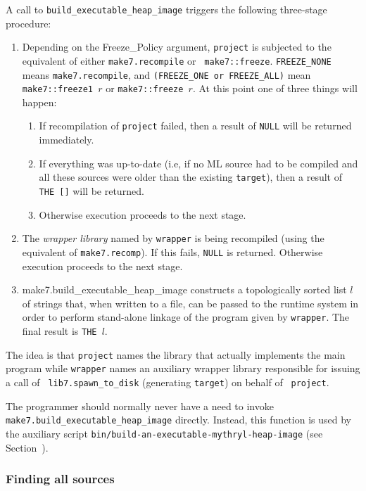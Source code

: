 A call to {\tt build_executable_heap_image} triggers the following three-stage
procedure:
\begin{enumerate}
\item Depending on the Freeze_Policy argument, {\tt project} is
subjected to the equivalent of either {\tt make7.recompile} or {\tt
make7::freeze}.  {\tt FREEZE_NONE} means {\tt make7.recompile}, and {\tt (FREEZE_ONE or FREEZE_ALL)}
mean {\tt make7::freeze1 $r$} or  {\tt make7::freeze $r$}.
At this point one of three things will happen:
\begin{enumerate}
\item If recompilation of {\tt project}
failed, then a result of {\tt NULL} will be returned immediately.
\item If everything was up-to-date (i.e, if no ML source had to be compiled
and all these sources were older than the existing {\tt target}), then
a result of {\tt THE []} will be returned.
\item Otherwise execution proceeds to the next stage.
\end{enumerate}
\item The {\em wrapper library} named by {\tt wrapper} is being
recompiled (using the equivalent of {\tt make7.recomp}).  If this
fails, {\tt NULL} is returned.  Otherwise execution proceeds to the
next stage.
\item {make7.build_executable_heap_image} constructs a topologically sorted list $l$
of strings that, when written to a file, can be passed to the runtime
system in order to perform stand-alone linkage of the program given by
{\tt wrapper}.  The final result is {\tt THE $l$}.
\end{enumerate}

The idea is that {\tt project} names the library that actually
implements the main program while {\tt wrapper} names an auxiliary
wrapper library responsible for issuing a call of {\tt
lib7.spawn_to_disk} (generating {\tt target}) on behalf of {\tt
project}.

The programmer should normally never have a need to invoke {\tt
make7.build_executable_heap_image} directly.  Instead, this function is used by
the auxiliary script {\tt bin/build-an-executable-mythryl-heap-image} (see
Section~).

\subsubsection{Finding all sources}
\label{sec:makedepend:support}

